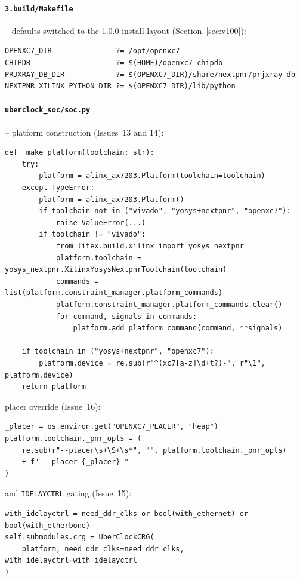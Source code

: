 \documentclass[11pt]{article}
\begin{document}
\paragraph{\texttt{3.build/Makefile}} -- defaults switched to the 1.0.0
install layout (Section~\ref{sec:v100}):
\begin{lstlisting}[style=codeblk]
OPENXC7_DIR               ?= /opt/openxc7
CHIPDB                    ?= $(HOME)/openxc7-chipdb
PRJXRAY_DB_DIR            ?= $(OPENXC7_DIR)/share/nextpnr/prjxray-db
NEXTPNR_XILINX_PYTHON_DIR ?= $(OPENXC7_DIR)/lib/python
\end{lstlisting}

\paragraph{\texttt{uberclock\_soc/soc.py}} -- platform construction
(Issues~13 and 14):
\begin{lstlisting}[style=codeblk]
def _make_platform(toolchain: str):
    try:
        platform = alinx_ax7203.Platform(toolchain=toolchain)
    except TypeError:
        platform = alinx_ax7203.Platform()
        if toolchain not in ("vivado", "yosys+nextpnr", "openxc7"):
            raise ValueError(...)
        if toolchain != "vivado":
            from litex.build.xilinx import yosys_nextpnr
            platform.toolchain = yosys_nextpnr.XilinxYosysNextpnrToolchain(toolchain)
            commands = list(platform.constraint_manager.platform_commands)
            platform.constraint_manager.platform_commands.clear()
            for command, signals in commands:
                platform.add_platform_command(command, **signals)

    if toolchain in ("yosys+nextpnr", "openxc7"):
        platform.device = re.sub(r"^(xc7[a-z]\d+t?)-", r"\1", platform.device)
    return platform
\end{lstlisting}
placer override (Issue~16):
\begin{lstlisting}[style=codeblk]
_placer = os.environ.get("OPENXC7_PLACER", "heap")
platform.toolchain._pnr_opts = (
    re.sub(r"--placer\s+\S+\s*", "", platform.toolchain._pnr_opts)
    + f" --placer {_placer} "
)
\end{lstlisting}
and \lstinline{IDELAYCTRL} gating (Issue~15):
\begin{lstlisting}[style=codeblk]
with_idelayctrl = need_ddr_clks or bool(with_ethernet) or bool(with_etherbone)
self.submodules.crg = UberClockCRG(
    platform, need_ddr_clks=need_ddr_clks, with_idelayctrl=with_idelayctrl
)
\end{lstlisting}
\end{document}
